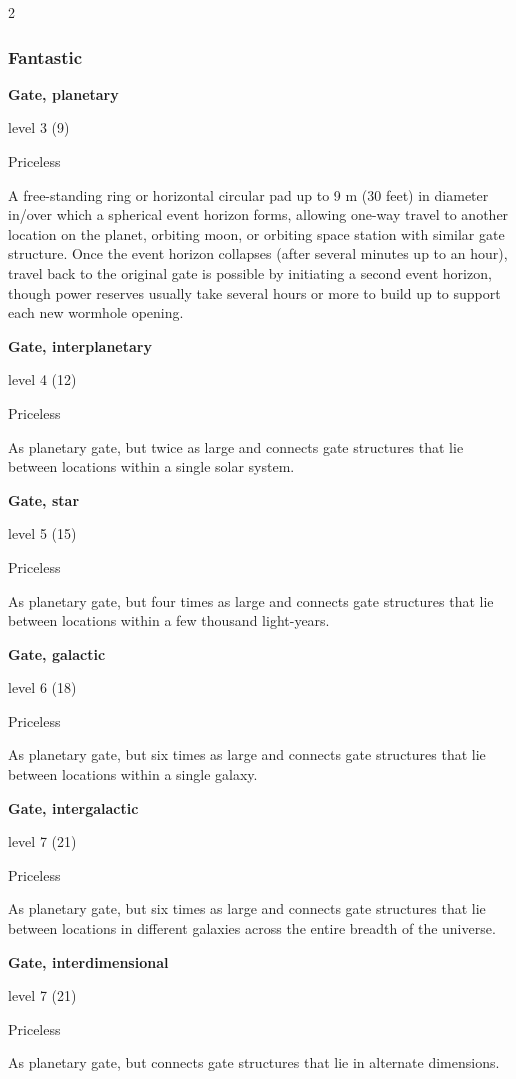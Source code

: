 \begin{multicols}{2}
\subsubsection{Fantastic}

\textbf{Gate, planetary} 

level 3 (9) 

Priceless 

A free-standing ring or horizontal circular pad up to 9 m (30 feet) in diameter in/over which a spherical event horizon forms, allowing one-way travel to another location on the planet, orbiting moon, or orbiting space station with similar gate structure. Once the event horizon collapses (after several minutes up to an hour), travel back to the original gate is possible by initiating a second event horizon, though power reserves usually take several hours or more to build up to support each new wormhole opening. 

\textbf{Gate, interplanetary} 

level 4 (12) 

Priceless

As planetary gate, but twice as large and connects gate structures that lie between locations within a single solar system. 

\textbf{Gate, star} 

level 5 (15) 

Priceless 

As planetary gate, but four times as large and connects gate structures that lie between locations within a few thousand light-years. 

\textbf{Gate, galactic} 

level 6 (18) 

Priceless 

As planetary gate, but six times as large and connects gate structures that lie between locations within a single galaxy. 

\textbf{Gate, intergalactic} 

level 7 (21) 

Priceless 

As planetary gate, but six times as large and connects gate structures that lie between locations in different galaxies across the entire breadth of the universe. 

\textbf{Gate, interdimensional} 

level 7 (21) 

Priceless 

As planetary gate, but connects gate structures that lie in alternate dimensions.


\end{multicols}
